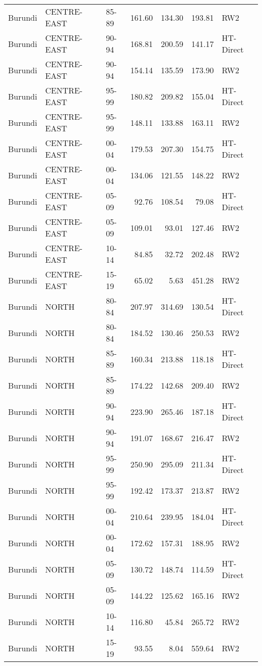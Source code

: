 \begin{longtable}{lllrrrl}
  Burundi & CENTRE-EAST & 85-89 & 161.60 & 134.30 & 193.81 & RW2 \\ 
  Burundi & CENTRE-EAST & 90-94 & 168.81 & 200.59 & 141.17 & HT-Direct \\ 
  Burundi & CENTRE-EAST & 90-94 & 154.14 & 135.59 & 173.90 & RW2 \\ 
  Burundi & CENTRE-EAST & 95-99 & 180.82 & 209.82 & 155.04 & HT-Direct \\ 
  Burundi & CENTRE-EAST & 95-99 & 148.11 & 133.88 & 163.11 & RW2 \\ 
  Burundi & CENTRE-EAST & 00-04 & 179.53 & 207.30 & 154.75 & HT-Direct \\ 
  Burundi & CENTRE-EAST & 00-04 & 134.06 & 121.55 & 148.22 & RW2 \\ 
  Burundi & CENTRE-EAST & 05-09 & 92.76 & 108.54 & 79.08 & HT-Direct \\ 
  Burundi & CENTRE-EAST & 05-09 & 109.01 & 93.01 & 127.46 & RW2 \\ 
  Burundi & CENTRE-EAST & 10-14 & 84.85 & 32.72 & 202.48 & RW2 \\ 
  Burundi & CENTRE-EAST & 15-19 & 65.02 & 5.63 & 451.28 & RW2 \\ 
  Burundi & NORTH & 80-84 & 207.97 & 314.69 & 130.54 & HT-Direct \\ 
  Burundi & NORTH & 80-84 & 184.52 & 130.46 & 250.53 & RW2 \\ 
  Burundi & NORTH & 85-89 & 160.34 & 213.88 & 118.18 & HT-Direct \\ 
  Burundi & NORTH & 85-89 & 174.22 & 142.68 & 209.40 & RW2 \\ 
  Burundi & NORTH & 90-94 & 223.90 & 265.46 & 187.18 & HT-Direct \\ 
  Burundi & NORTH & 90-94 & 191.07 & 168.67 & 216.47 & RW2 \\ 
  Burundi & NORTH & 95-99 & 250.90 & 295.09 & 211.34 & HT-Direct \\ 
  Burundi & NORTH & 95-99 & 192.42 & 173.37 & 213.87 & RW2 \\ 
  Burundi & NORTH & 00-04 & 210.64 & 239.95 & 184.04 & HT-Direct \\ 
  Burundi & NORTH & 00-04 & 172.62 & 157.31 & 188.95 & RW2 \\ 
  Burundi & NORTH & 05-09 & 130.72 & 148.74 & 114.59 & HT-Direct \\ 
  Burundi & NORTH & 05-09 & 144.22 & 125.62 & 165.16 & RW2 \\ 
  Burundi & NORTH & 10-14 & 116.80 & 45.84 & 265.72 & RW2 \\ 
  Burundi & NORTH & 15-19 & 93.55 & 8.04 & 559.64 & RW2 \\ 

\end{longtable}
